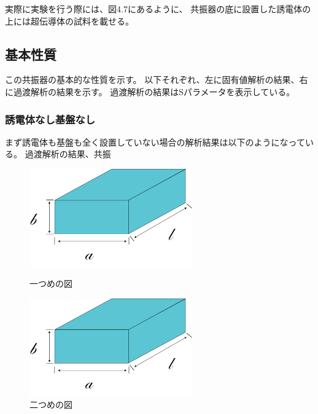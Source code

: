 実際に実験を行う際には、図4.7にあるように、
共振器の底に設置した誘電体の上には超伝導体の試料を載せる。

\subsection{基本性質}
この共振器の基本的な性質を示す。
以下それぞれ、左に固有値解析の結果、右に過渡解析の結果を示す。
過渡解析の結果はSパラメータを表示している。

\subsubsection{誘電体なし基盤なし}
まず誘電体も基盤も全く設置していない場合の解析結果は以下のようになっている。
過渡解析の結果、共振

\begin{figure}[h]
 \begin{minipage}{0.5\hsize}
  \begin{center}
   \includegraphics[width=70mm]{./image/空洞共振器.png}
  \end{center}
  \caption{一つめの図}
  \label{fig:one}
 \end{minipage}
 \begin{minipage}{0.5\hsize}
  \begin{center}
   \includegraphics[width=70mm]{./image/空洞共振器.png}
  \end{center}
  \caption{二つめの図}
  \label{fig:two}
 \end{minipage}
\end{figure}

